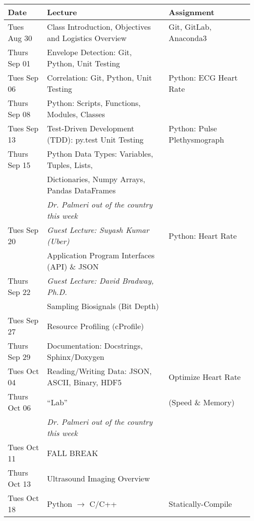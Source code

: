 \begin{longtable}[c]{|l|l|l|}

    \hline 
    
    \textbf{Date} & \textbf{Lecture} & \textbf{Assignment}\\

    \hline

    Tues Aug 30     & Class Introduction, Objectives and Logistics Overview & Git, GitLab, Anaconda3 \\
    Thurs Sep 01    & Envelope Detection: Git, Python, Unit Testing& \\
    \hline
    Tues Sep 06     & Correlation: Git, Python, Unit Testing & Python: ECG Heart Rate \\
    Thurs Sep 08    & Python: Scripts, Functions, Modules, Classes & \\
    \hline
    Tues Sep 13     & Test-Driven Development (TDD): py.test Unit Testing & Python: Pulse Plethysmograph \\
    Thurs Sep 15    & Python Data Types: Variables, Tuples, Lists, & \\
                    & Dictionaries, Numpy Arrays, Pandas DataFrames & \\
    \hline
                    & \emph{Dr. Palmeri out of the country this week} & \\
    Tues Sep 20     & \emph{Guest Lecture: Suyash Kumar (Uber)} & Python: Heart Rate \\
                    & Application Program Interfaces (API) \& JSON & \\
    Thurs Sep 22    & \emph{Guest Lecture: David Bradway, Ph.D.} & \\
                    & Sampling Biosignals (Bit Depth) & \\
    \hline
    Tues Sep 27    & Resource Profiling (cProfile) & \\
    Thurs Sep 29    & Documentation: Docstrings, Sphinx/Doxygen & \\
    \hline
    Tues Oct 04     & Reading/Writing Data: JSON, ASCII, Binary, HDF5 & Optimize Heart Rate \\
    Thurs Oct 06    & ``Lab'' & (Speed \& Memory) \\
    \hline
                    & \emph{Dr. Palmeri out of the country this week} & \\
    Tues Oct 11     & FALL BREAK & \\
    Thurs Oct 13    & Ultrasound Imaging Overview & \\
    \hline
    Tues Oct 18     & Python $\rightarrow$ C/C++ & Statically-Compile \\

\end{longtable}

